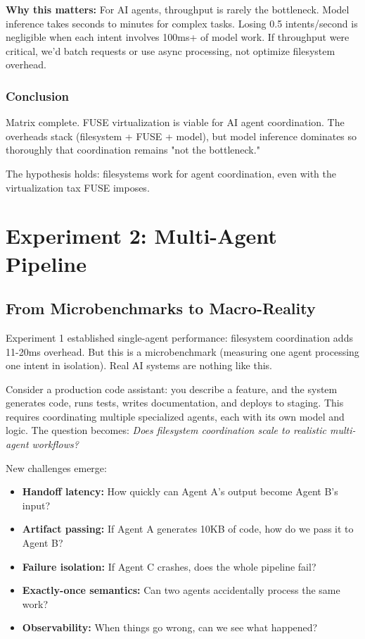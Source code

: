 \documentclass[11pt]{article}
\begin{document}
\textbf{Why this matters:} For AI agents, throughput is rarely the bottleneck. Model inference takes seconds to minutes for complex tasks. Losing 0.5 intents/second is negligible when each intent involves 100ms+ of model work. If throughput were critical, we'd batch requests or use async processing, not optimize filesystem overhead.

\subsubsection{Conclusion}

Matrix complete. FUSE virtualization is viable for AI agent coordination. The overheads stack (filesystem + FUSE + model), but model inference dominates so thoroughly that coordination remains "not the bottleneck."

The hypothesis holds: filesystems work for agent coordination, even with the virtualization tax FUSE imposes.

\section{Experiment 2: Multi-Agent Pipeline}

\subsection{From Microbenchmarks to Macro-Reality}

Experiment 1 established single-agent performance: filesystem coordination adds 11-20ms overhead. But this is a microbenchmark (measuring one agent processing one intent in isolation). Real AI systems are nothing like this.

Consider a production code assistant: you describe a feature, and the system generates code, runs tests, writes documentation, and deploys to staging. This requires coordinating multiple specialized agents, each with its own model and logic. The question becomes: \textit{Does filesystem coordination scale to realistic multi-agent workflows?}

New challenges emerge:
\begin{itemize}
\item \textbf{Handoff latency:} How quickly can Agent A's output become Agent B's input?
\item \textbf{Artifact passing:} If Agent A generates 10KB of code, how do we pass it to Agent B?
\item \textbf{Failure isolation:} If Agent C crashes, does the whole pipeline fail?
\item \textbf{Exactly-once semantics:} Can two agents accidentally process the same work?
\item \textbf{Observability:} When things go wrong, can we see what happened?
\end{itemize}
\end{document}
